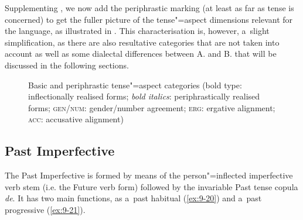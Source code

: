 Supplementing , we now add the periphrastic marking (at least as far as tense is concerned) to get the fuller picture of the tense"=aspect dimensions relevant for the language, as illustrated in . This characterisation is, however, a~slight simplification, as there are also resultative categories that are not taken into account as well as some dialectal differences between A. and B. that will be discussed in the following sections.


\begin{figure}[ht]
\centering
{}
\caption{Basic and periphrastic tense"=aspect categories (bold type: inflectionally realised forms;
  \textit{bold italics}: periphrastically realised forms; \textsc{gen/num}: gender/number agreement;
  \textsc{erg}: ergative alignment; \textsc{acc}: accusative alignment)\label{fig:9-2}}
\end{figure}

\subsection{Past Imperfective}
\label{subsec:9-1-6}

The Past Imperfective is formed by means of the person"=inflected imperfective verb stem (i.e. the Future verb form) followed by the invariable Past tense copula \textit{de}. It has two main functions, as a~past habitual (\ref{ex:9-20}) and a~past progressive (\ref{ex:9-21}).

